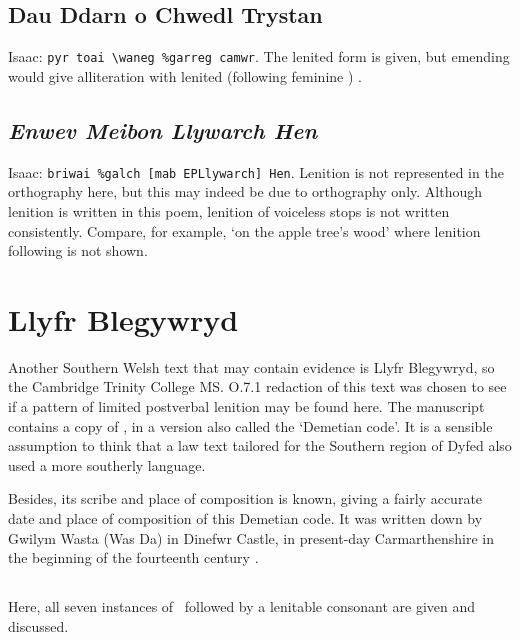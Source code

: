 \subsection{Dau Ddarn o Chwedl Trystan}
Isaac: \verb|pyr toai \waneg %garreg camwr|. The lenited form is given, but emending  would give alliteration with lenited (following feminine ) .


\subsection{\textit{Enwev Meibon Llywarch Hen}}
Isaac: \verb|briwai %galch [mab EPLlywarch] Hen|. Lenition is not represented in the orthography here, but this may indeed be due to orthography only. Although lenition is written in this poem, lenition of voiceless stops is not written consistently. Compare, for example,  `on the apple tree's wood' where lenition following  is not shown.
\section{Llyfr Blegywryd}

Another Southern Welsh text that may contain evidence is Llyfr Blegywryd, so the Cambridge Trinity College MS. O.7.1 redaction of this text was chosen to see if a pattern of limited postverbal lenition may be found here. The manuscript contains a copy of , in a version also called the `Demetian code'. It is a sensible assumption to think that a law text tailored for the Southern region of Dyfed also used a more southerly language. 

Besides, its scribe and place of composition is known, giving a fairly accurate date and place of composition of this Demetian code. It was written down by Gwilym Wasta (Was Da) in Dinefwr Castle, in present-day Carmarthenshire in the beginning of the fourteenth century \parencite[429]{owen_gwilym_1980}. 

\subsection{\ei}
Here, all seven instances of \ei\ followed by a lenitable consonant are given and discussed.


